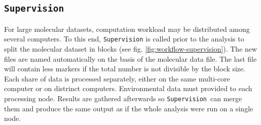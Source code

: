 \documentclass[a4paper,11pt]{article}
\newcommand{\prog}[1]{\texttt{#1}}
\begin{document}
\subsection{\prog{Supervision}}

For large molecular datasets, computation workload may be distributed among several computers.
To this end, \prog{Supervision} is called prior to the analysis to split the molecular dataset in blocks (see fig. \ref{fig:workflow-supervision}).
The new files are named automatically on the basis of the molecular data file.
The last file will contain less markers if the total number is not divisible by the block size.
Each share of data is processed separately, either on the same multi-core computer or on distrinct computers.
Environmental data must provided to each processing node.
Results are gathered afterwards so \prog{Supervision}\ can merge them and produce the same output as if the whole analysis were run on a single node.
\end{document}
